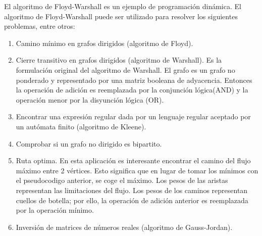 El algoritmo de Floyd-Warshall es un ejemplo de programación dinámica. El algoritmo de Floyd-Warshall puede ser utilizado para resolver los siguientes problemas, entre otros:

\begin{enumerate}
	\item Camino mínimo en grafos dirigidos (algoritmo de Floyd).
	\item Cierre transitivo en grafos dirigidos (algoritmo de Warshall). Es la formulación original del algoritmo de Warshall. El grafo es un grafo no ponderado y representado por una matriz booleana de adyacencia. Entonces la operación de adición es reemplazada por la conjunción lógica(AND) y la operación menor por la disyunción lógica (OR).
	\item Encontrar una expresión regular dada por un lenguaje regular aceptado por un autómata finito (algoritmo de Kleene).
	\item Comprobar si un grafo no dirigido es bipartito.
	\item Ruta optima. En esta aplicación es interesante encontrar el camino del flujo máximo entre 2 vértices. Esto significa que en lugar de tomar los mínimos con el pseudocodigo anterior, se coge el máximo. Los pesos de las aristas representan las limitaciones del flujo. Los pesos de los caminos representan cuellos de botella; por ello, la operación de adición anterior es reemplazada por la operación mínimo.
	\item Inversión de matrices de números reales (algoritmo de Gauss-Jordan). 
\end{enumerate}